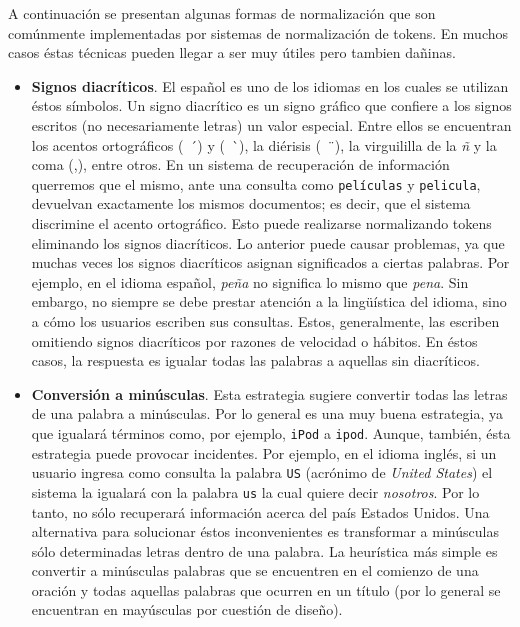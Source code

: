 		A continuación se presentan algunas formas de normalización que son comúnmente implementadas por sistemas de normalización de tokens. En muchos casos éstas técnicas pueden llegar a ser muy útiles pero tambien dañinas.
		\begin{itemize}
			\item \textbf{Signos diacríticos}. El español es uno de los idiomas en los cuales se utilizan éstos símbolos. Un signo diacrítico es un signo gráfico que confiere a los signos escritos (no necesariamente letras) un valor especial. Entre ellos se encuentran los acentos ortográficos (\ \' \ ) y (\ \` \ ), la diérisis (\ \" \ ), la virguililla de la \textit{ñ} y la coma (,), entre otros. En un sistema de recuperación de información querremos que el mismo, ante una consulta como \texttt{películas} y \texttt{pelicula}, devuelvan exactamente los mismos documentos; es decir, que el sistema discrimine el acento ortográfico. Esto puede realizarse normalizando tokens eliminando los signos diacríticos. Lo anterior puede causar problemas, ya que muchas veces los signos diacríticos asignan significados a ciertas palabras. Por ejemplo, en el idioma español, \textit{peña} no significa lo mismo que \textit{pena}. Sin embargo, no siempre se debe prestar atención a la lingüística del idioma, sino a cómo los usuarios escriben sus consultas. Estos, generalmente, las escriben omitiendo signos diacríticos por razones de velocidad o hábitos. En éstos casos, la respuesta es igualar todas las palabras a aquellas sin diacríticos.
			\item \textbf{Conversión a minúsculas}. Esta estrategia sugiere convertir todas las letras de una palabra a minúsculas. Por lo general es una muy buena estrategia, ya que igualará  términos como, por ejemplo, \texttt{iPod} a \texttt{ipod}. Aunque, también, ésta estrategia puede provocar incidentes. Por ejemplo, en el idioma inglés, si un usuario ingresa como consulta la palabra \texttt{US} (acrónimo de \textit{United States}) el sistema la igualará con la palabra \texttt{us} la cual quiere decir \textit{nosotros}. Por lo tanto, no sólo recuperará información acerca del país Estados Unidos. Una alternativa para solucionar éstos inconvenientes es transformar a minúsculas sólo determinadas letras dentro de una palabra. La heurística más simple es convertir a minúsculas palabras que se encuentren en el comienzo de una oración y todas aquellas palabras que ocurren en un título (por lo general se encuentran en mayúsculas por cuestión de diseño). 
		\end{itemize}
		
